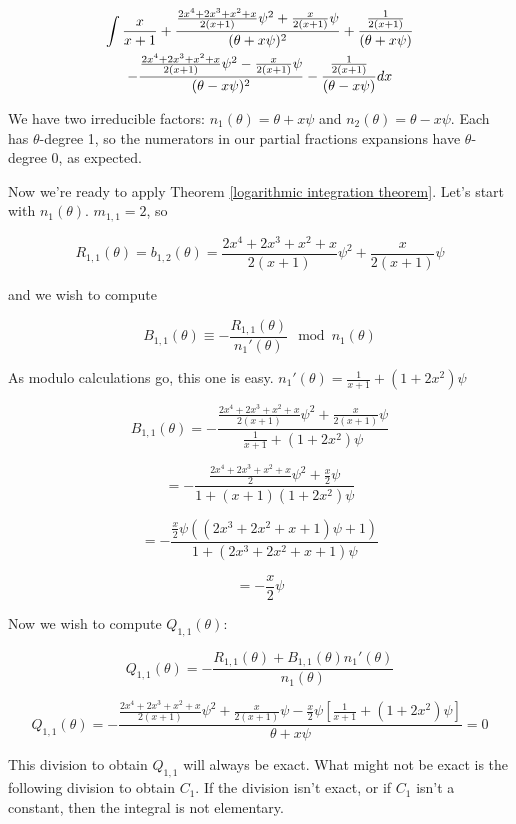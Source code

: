 \begin{multline*}
\int {x\over{x+1}} + \frac{\frac{2x^4+2x^3+x^2+x}{2(x+1)}\psi^2 + \frac{x}{2(x+1)} \psi}{(\theta + x \psi)^2}
       + \frac{\frac{1}{2(x+1)}}{(\theta + x \psi)} \\
       - \frac{\frac{2x^4+2x^3+x^2+x}{2(x+1)}\psi^2 - \frac{x}{2(x+1)} \psi}{(\theta - x \psi)^2}
       - \frac{\frac{1}{2(x+1)}}{(\theta - x \psi)} dx
\end{multline*}


We have two irreducible factors: $n_1(\theta) = \theta + x \psi$ and
$n_2(\theta) = \theta - x \psi$.  Each has $\theta$-degree 1, so
the numerators in our partial fractions expansions have
$\theta$-degree 0, as expected.

Now we're ready to apply
Theorem \ref{logarithmic integration theorem}.  Let's start with
$n_1(\theta)$.  $m_{1,1}=2$, so

$$R_{1,1}(\theta) = b_{1,2}(\theta) = \frac{2x^4+2x^3+x^2+x}{2(x+1)}\psi^2 + \frac{x}{2(x+1)} \psi$$

and we wish to compute

$$ B_{1,1}(\theta) \equiv - \frac{R_{1,1}(\theta)}{n_1'(\theta) } \mod n_1(\theta)$$

As modulo calculations go, this one is easy. $n_1'(\theta) = \frac{1}{x+1} + (1 + 2 x^2) \psi$

$$ B_{1,1}(\theta) = - \frac{\frac{2x^4+2x^3+x^2+x}{2(x+1)}\psi^2 + \frac{x}{2(x+1)} \psi}{\frac{1}{x+1} + (1 + 2 x^2) \psi}$$

$$ = - \frac{\frac{2x^4+2x^3+x^2+x}{2}\psi^2 + \frac{x}{2} \psi}{1 + (x+1)(1 + 2 x^2) \psi}$$


$$ = - \frac{\frac{x}{2}\psi ( (2x^3+2x^2+x+1)\psi + 1)}{1 + (2 x^3 + 2 x^2 + x + 1) \psi}$$

$$ = - \frac{x}{2}\psi$$

Now we wish to compute $Q_{1,1}(\theta)$:

$$ Q_{1,1}(\theta) = - \frac{R_{1,1}(\theta) + B_{1,1}(\theta) n_1'(\theta)}{n_1(\theta)}$$

$$ Q_{1,1}(\theta) = - \frac{\frac{2x^4+2x^3+x^2+x}{2(x+1)}\psi^2 + \frac{x}{2(x+1)} \psi - \frac{x}{2}\psi \left[\frac{1}{x+1} + (1 + 2 x^2) \psi\right]}{\theta + x \psi} = 0$$

This division to obtain $Q_{1,1}$ will always be exact.  What might not be exact is the following division
to obtain $C_{1}$.  If the division isn't exact, or if $C_1$ isn't a constant, then the integral is not elementary.

